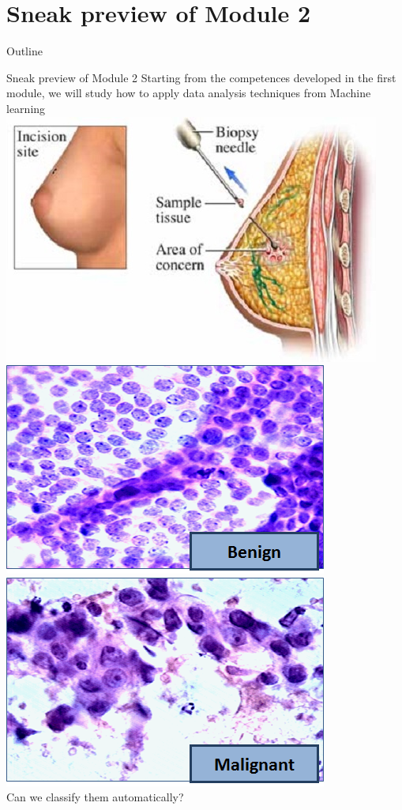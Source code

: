 \documentclass{beamer}%
\begin{document}
\section{Sneak preview of Module 2}
\begin{frame}{Outline}
	\tableofcontents[currentsection]
\end{frame}

\begin{frame}{Sneak preview of Module 2}
	\centering 
	Starting from the competences developed in the first module, we will study
	how to apply data analysis techniques from Machine learning
	\includegraphics[width=0.4\linewidth]{figures/Breast-Biopsy-2.jpg}\\
	\includegraphics[width=0.4\linewidth]{figures/fna-benign1.png}
	\includegraphics[width=0.4\linewidth]{figures/fna-malignant1.png}\\
	Can we classify them automatically?
\end{frame}
\end{document}
